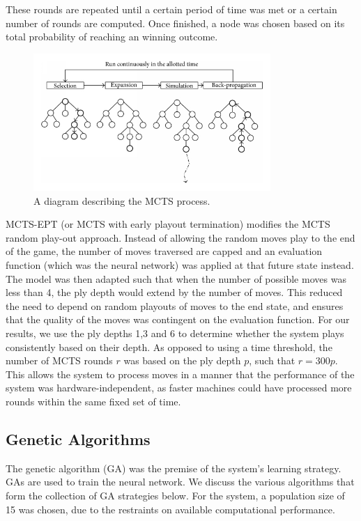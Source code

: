 \documentclass[12pt,a4paper]{article}
\begin{document}
        These rounds are repeated until a certain period of time was met or a certain number of rounds are computed. Once finished, a node was chosen based on its total probability of reaching an winning outcome.

        \begin{figure}[!ht]
            \centering
            \includegraphics[width=90mm]{images/montecarlo.png}
            \caption{A diagram describing the MCTS process.}
        \end{figure}

        MCTS-EPT (or MCTS with early playout termination) modifies the MCTS random play-out approach. Instead of allowing the random moves play to the end of the game, the number of moves traversed are capped and an evaluation function (which was the neural network) was applied at that future state instead. \cite{lorentz_using_2016} The model was then adapted such that when the number of possible moves was less than 4, the ply depth would extend by the number of moves. This reduced the need to depend on random playouts of moves to the end state, and ensures that the quality of the moves was contingent on the evaluation function. For our results, we use the ply depths 1,3 and 6 to determine whether the system plays consistently based on their depth. As opposed to using a time threshold, the number of MCTS rounds $r$ was based on the ply depth $p$, such that $r=300p$. This allows the system to process moves in a manner that the performance of the system was hardware-independent, as faster machines could have processed more rounds within the same fixed set of time.


    \subsection{Genetic Algorithms}
        The genetic algorithm (GA) was the premise of the system's learning strategy. GAs are used to train the neural network. We discuss the various algorithms that form the collection of GA strategies below. For the system, a population size of 15 was chosen, due to the restraints on available computational performance.
\end{document}
